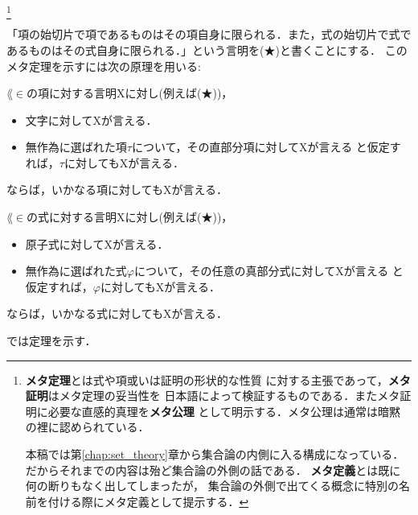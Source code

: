 	\footnote[0]{
		{\bf メタ定理}とは式や項或いは証明の形状的な性質
		に対する主張であって，{\bf メタ証明}はメタ定理の妥当性を
		日本語によって検証するものである．またメタ証明に必要な直感的真理を{\bf メタ公理}
		として明示する．メタ公理は通常は暗黙の裡に認められている．
		
		本稿では第\ref{chap:set_theory}章から集合論の内側に入る構成になっている．
		だからそれまでの内容は殆ど集合論の外側の話である．
		{\bf メタ定義}とは既に何の断りもなく出してしまったが，
		集合論の外側で出てくる概念に特別の名前を付ける際にメタ定義として提示する．
	}
	
	「項の始切片で項であるものはその項自身に限られる．また，式の始切片で式であるものはその式自身に限られる．」という言明を(★)と書くことにする．
	このメタ定理を示すには次の原理を用いる:
	
	\begin{screen}
		\begin{metaaxm}
			$\lang{\in}$の項に対する言明Xに対し(例えば(★))，
			\begin{itemize}
				\item 文字に対してXが言える．
				\item 無作為に選ばれた項$\tau$について，その直部分項に対してXが言える
					と仮定すれば，$\tau$に対してもXが言える．
			\end{itemize}
			ならば，いかなる項に対してもXが言える．
		\end{metaaxm}
	\end{screen}
	
	\begin{screen}
		\begin{metaaxm}
			$\lang{\in}$の式に対する言明Xに対し(例えば(★))，
			\begin{itemize}
				\item 原子式に対してXが言える．
				\item 無作為に選ばれた式$\varphi$について，その任意の真部分式に対してXが言える
					と仮定すれば，$\varphi$に対してもXが言える．
			\end{itemize}
			ならば，いかなる式に対してもXが言える．
		\end{metaaxm}
	\end{screen}
	
	では定理を示す．
	
